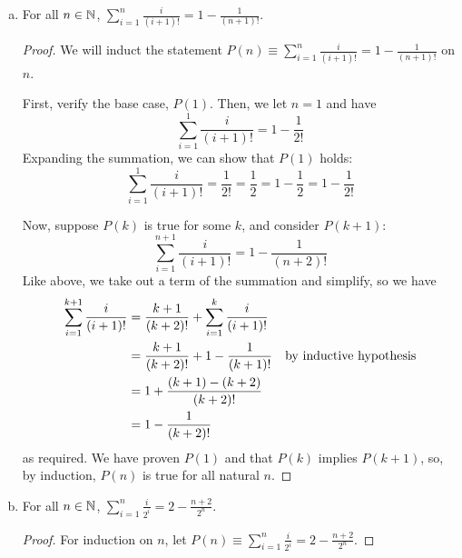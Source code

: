 \begin{enumerate}[(a)]
\begin{proof}
          (Inductive Step) Now, suppose that $P(k)$ holds for an arbitrary $k$.
          Again, expand the summation but for the LHS of $P(k+1)$:
          \begin{align*}
            \sum^{k+1}_{i=0} r^i
             & = r^{k+1} + \sum^k_{i=0} r^i                  \\
             & = r^{k+1} + \frac{1-r^{k+1}}{1-r} \IH         \\
             & = \frac{(r^{k+1})(1-r) + 1 - r^{k+1}}{1-r}    \\
             & = \frac{r^{k+1} - r^{k+2} + 1 - r^{k+1}}{1-r} \\
             & = \frac{1 - r^{k+2}}{1-r}                     \\
          \end{align*}
          which is the other side of the equality.
          We have proved that if $P(n)$ holds, then $P(n+1)$ holds.
          Therefore, by induction, $P(n)$ holds for all natural $n$.
        \end{proof}
  \item For all $n\in\mathbb{N}$, $\displaystyle \sum^n_{i=1} \frac{i}{(i+1)!} = 1-\frac{1}{(n+1)!}$.
        \begin{proof}
          We will induct the statement $P(n) \equiv \sum^n_{i=1} \frac{i}{(i+1)!} = 1-\frac{1}{(n+1)!}$ on $n$.

          First, verify the base case, $P(1)$.
          Then, we let $n=1$ and have
          \[ \sum^1_{i=1} \frac{i}{(i+1)!} = 1-\frac{1}{2!} \]
          Expanding the summation, we can show that $P(1)$ holds:
          \[ \sum^1_{i=1} \frac{i}{(i+1)!} = \frac{1}{2!} = \frac{1}{2} = 1-\frac{1}{2} = 1-\frac{1}{2!} \]

          Now, suppose $P(k)$ is true for some $k$, and consider $P(k+1)$:
          \[ \sum^{n+1}_{i=1} \frac{i}{(i+1)!} = 1-\frac{1}{(n+2)!} \]
          Like above, we take out a term of the summation and simplify, so we have
          \begin{align*}
            \sum^{k+1}_{i=1} \frac{i}{(i+1)!}
             & = \frac{k+1}{(k+2)!} + \sum^{k}_{i=1} \frac{i}{(i+1)!} \\
             & = \frac{k+1}{(k+2)!} + 1 - \frac{1}{(k+1)!} & \text{by inductive hypothesis}        \\
             & = 1 + \frac{(k+1) - (k+2)}{(k+2)!}                     \\
             & = 1 - \frac{1}{(k+2)!}
          \end{align*}
          as required.
          We have proven $P(1)$ and that $P(k)$ implies $P(k+1)$, so, by induction, $P(n)$ is true for all natural $n$.
        \end{proof}
  \item For all $n\in\mathbb{N}$, $\displaystyle \sum^n_{i=1} \frac{i}{2^i} = 2-\frac{n+2}{2^n}$.
        \begin{proof}
          For induction on $n$, let $P(n) \equiv \sum^n_{i=1} \frac{i}{2^i} = 2-\frac{n+2}{2^n}$.


\end{proof}
\end{enumerate}
